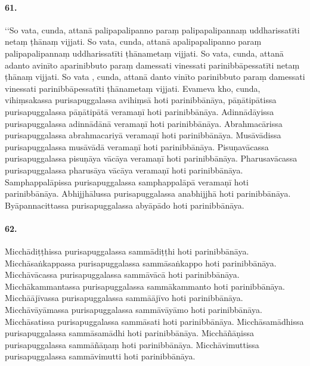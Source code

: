 \paragraph{61.} ‘‘So vata, cunda, attanā palipapalipanno paraṃ palipapalipannaṃ uddharissatīti netaṃ ṭhānaṃ vijjati. So vata, cunda, attanā apalipapalipanno paraṃ palipapalipannaṃ uddharissatīti ṭhānametaṃ vijjati. So vata, cunda, attanā adanto avinīto aparinibbuto paraṃ damessati vinessati parinibbāpessatīti netaṃ ṭhānaṃ vijjati. So vata , cunda, attanā danto vinīto parinibbuto paraṃ damessati vinessati parinibbāpessatīti ṭhānametaṃ vijjati. Evameva kho, cunda, vihiṃsakassa purisapuggalassa avihiṃsā hoti parinibbānāya, pāṇātipātissa purisapuggalassa pāṇātipātā veramaṇī hoti parinibbānāya. Adinnādāyissa purisapuggalassa adinnādānā veramaṇī hoti parinibbānāya. Abrahmacārissa purisapuggalassa abrahmacariyā veramaṇī hoti parinibbānāya. Musāvādissa purisapuggalassa musāvādā veramaṇī hoti parinibbānāya. Pisuṇavācassa purisapuggalassa pisuṇāya vācāya veramaṇī hoti parinibbānāya. Pharusavācassa purisapuggalassa pharusāya vācāya veramaṇī hoti parinibbānāya. Samphappalāpissa purisapuggalassa samphappalāpā veramaṇī hoti parinibbānāya. Abhijjhālussa purisapuggalassa anabhijjhā hoti parinibbānāya. Byāpannacittassa purisapuggalassa abyāpādo hoti parinibbānāya.

\paragraph{62.} Micchādiṭṭhissa purisapuggalassa sammādiṭṭhi hoti parinibbānāya. Micchāsaṅkappassa purisapuggalassa sammāsaṅkappo hoti parinibbānāya. Micchāvācassa purisapuggalassa sammāvācā hoti parinibbānāya. Micchākammantassa purisapuggalassa sammākammanto hoti parinibbānāya. Micchāājīvassa purisapuggalassa sammāājīvo hoti parinibbānāya. Micchāvāyāmassa purisapuggalassa sammāvāyāmo hoti parinibbānāya. Micchāsatissa purisapuggalassa sammāsati hoti parinibbānāya. Micchāsamādhissa purisapuggalassa sammāsamādhi hoti parinibbānāya. Micchāñāṇissa purisapuggalassa sammāñāṇaṃ hoti parinibbānāya. Micchāvimuttissa purisapuggalassa sammāvimutti hoti parinibbānāya.

